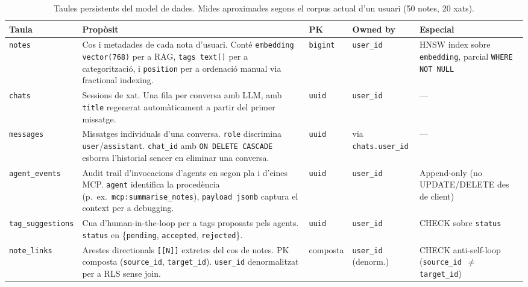 \begin{table}[H]
    \centerfloat
    \footnotesize
    \caption{Taules persistents del model de dades. Mides aproximades segons el corpus actual d'un usuari (50 notes, 20 xats).}
    \label{tab:schema-summary}
    \begin{tabular}{@{}l>{\raggedright\arraybackslash}p{4.3cm}l>{\raggedright\arraybackslash}p{2.3cm}>{\raggedright\arraybackslash}p{3.4cm}@{}}
        \toprule
        Taula & Propòsit & PK & Owned by & Especial \\
        \midrule
        \texttt{notes} & Cos i metadades de cada nota d'usuari. Conté \texttt{embedding vector(768)} per a RAG, \texttt{tags text[]} per a categorització, i \texttt{position} per a ordenació manual via fractional indexing. & \texttt{bigint} & \texttt{user\_id} & HNSW index sobre \texttt{embedding}, parcial \texttt{WHERE NOT NULL} \\
        \texttt{chats} & Sessions de xat. Una fila per conversa amb LLM, amb \texttt{title} regenerat automàticament a partir del primer missatge. & \texttt{uuid} & \texttt{user\_id} & --- \\
        \texttt{messages} & Missatges individuals d'una conversa. \texttt{role} discrimina \texttt{user}/\texttt{assistant}. \texttt{chat\_id} amb \texttt{ON DELETE CASCADE} esborra l'historial sencer en eliminar una conversa. & \texttt{uuid} & via \texttt{chats.user\_id} & --- \\
        \texttt{agent\_events} & Audit trail d'invocacions d'agents en segon pla i d'eines MCP. \texttt{agent} identifica la procedència (p.~ex.\ \texttt{mcp:summarise\_notes}), \texttt{payload jsonb} captura el context per a debugging. & \texttt{uuid} & \texttt{user\_id} & Append-only (no UPDATE/DELETE des de client) \\
        \texttt{tag\_suggestions} & Cua d'human-in-the-loop per a tags proposats pels agents. \texttt{status} en {\{\texttt{pending}, \texttt{accepted}, \texttt{rejected}\}}. & \texttt{uuid} & \texttt{user\_id} & CHECK sobre \texttt{status} \\
        \texttt{note\_links} & Arestes directionals \texttt{[[N]]} extretes del cos de notes. PK composta (\texttt{source\_id}, \texttt{target\_id}). \texttt{user\_id} denormalitzat per a RLS sense join. & composta & \texttt{user\_id} (denorm.) & CHECK anti-self-loop (\texttt{source\_id $\neq$ target\_id}) \\
        \bottomrule
    \end{tabular}
\end{table}

